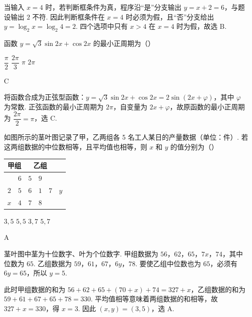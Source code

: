 \begin{solution}
当输入 \(x=4\) 时，若判断框条件为真，程序沿“是”分支输出 \(y=x+2=6\)，与题设输出 \(2\) 不符. 因此判断框条件在 \(x=4\) 时必须为假，且“否”分支给出 \(y=\log_2x=\log_2 4=2\). 四个选项中只有 \(x>4\) 在 \(x=4\) 时为假，故选 B.
\end{solution}

\begin{problem}
函数 \(y=\sqrt3\sin2x+\cos2x\) 的最小正周期为（\quad）

\choices
    {\(\dfrac{\pi}{2}\)}
    {\(\dfrac{2\pi}{3}\)}
    {\(\pi\)}
    {\(2\pi\)}
\end{problem}

\begin{answer}
C
\end{answer}

\begin{solution}
将函数合成为正弦型函数：\(y=\sqrt3\sin2x+\cos2x=2\sin\left(2x+\varphi\right)\)，其中 \(\varphi\) 为常数. 正弦函数的最小正周期为 \(2\pi\)，自变量为 \(2x+\varphi\)，故原函数的最小正周期为 \(\dfrac{2\pi}{2}=\pi\)，选 C.
\end{solution}

\begin{problem}
如图所示的茎叶图记录了甲，乙两组各 5 名工人某日的产量数据（单位：件）. 若这两组数据的中位数相等，且平均值也相等，则 \(x\) 和 \(y\) 的值分别为（\quad）

\begin{center}
\begin{tabular}{cc|c|ccc}
\multicolumn{2}{c|}{甲组} & \multicolumn{3}{c}{乙组} \\
\hline
 & \(6\) & \(5\) & \(9\) & & \\
\(2\) & \(5\) & \(6\) & \(1\) & \(7\) & \(y\) \\
\(x\) & \(4\) & \(7\) & \(8\) & &
\end{tabular}
\end{center}

\choices
    {\(3,5\)}
    {\(5,5\)}
    {\(3,7\)}
    {\(5,7\)}
\end{problem}

\begin{answer}
A
\end{answer}

\begin{solution}
茎叶图中茎为十位数字、叶为个位数字. 甲组数据为 \(56\)，\(62\)，\(65\)，\(7x\)，\(74\)，其中位数为 \(65\). 乙组数据为 \(59\)，\(61\)，\(67\)，\(6y\)，\(78\). 要使乙组中位数也为 \(65\)，必须有 \(6y=65\)，所以 \(y=5\).

此时甲组数据的和为 \(56+62+65+(70+x)+74=327+x\)，乙组数据的和为 \(59+61+67+65+78=330\). 平均值相等意味着两组数据的和相等，故 \(327+x=330\)，得 \(x=3\). 因此 \((x,y)=(3,5)\)，选 A.
\end{solution}

